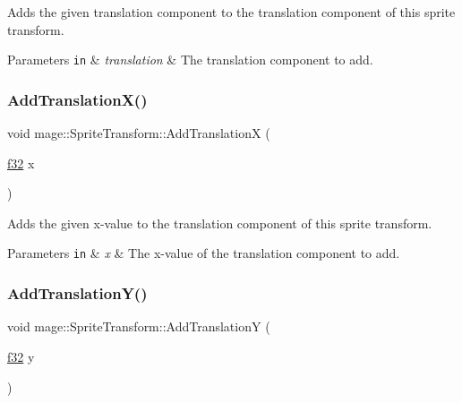 Adds the given translation component to the translation component of this sprite transform.


\begin{DoxyParams}[1]{Parameters}
\mbox{\tt in}  & {\em translation} & The translation component to add. \\
\hline
\end{DoxyParams}
\hypertarget{structmage_1_1_sprite_transform_ae24bc2d7c5613ec24a8aadb31c585c63}{}\label{structmage_1_1_sprite_transform_ae24bc2d7c5613ec24a8aadb31c585c63} 
\subsubsection{\texorpdfstring{Add\+Translation\+X()}{AddTranslationX()}}
{\footnotesize\ttfamily void mage\+::\+Sprite\+Transform\+::\+Add\+TranslationX (\begin{DoxyParamCaption}\item[{\hyperlink{namespacemage_a6a44ad388483959dc4dff9f2aef91431}{f32}}]{x }\end{DoxyParamCaption})\hspace{0.3cm}{\ttfamily [noexcept]}}

Adds the given x-\/value to the translation component of this sprite transform.


\begin{DoxyParams}[1]{Parameters}
\mbox{\tt in}  & {\em x} & The x-\/value of the translation component to add. \\
\hline
\end{DoxyParams}
\hypertarget{structmage_1_1_sprite_transform_ae7ef091cd89f75759c34f348ea1c263e}{}\label{structmage_1_1_sprite_transform_ae7ef091cd89f75759c34f348ea1c263e} 
\subsubsection{\texorpdfstring{Add\+Translation\+Y()}{AddTranslationY()}}
{\footnotesize\ttfamily void mage\+::\+Sprite\+Transform\+::\+Add\+TranslationY (\begin{DoxyParamCaption}\item[{\hyperlink{namespacemage_a6a44ad388483959dc4dff9f2aef91431}{f32}}]{y }\end{DoxyParamCaption})\hspace{0.3cm}{\ttfamily [noexcept]}}


